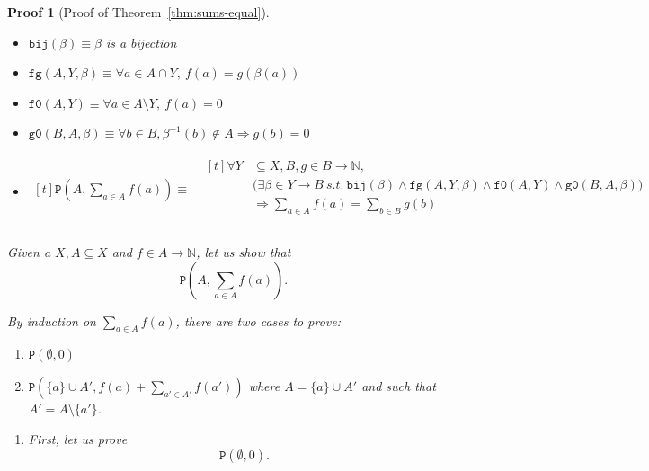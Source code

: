 \documentclass[pdflatex,sn-mathphys]{sn-jnl}%
\theoremstyle{thmstyleone}%
\theoremstyle{thmstyletwo}%
\newtheorem*{pf}{Proof}%
\theoremstyle{thmstylethree}%
\begin{document}
\begin{appendices}
\begin{pf}[Proof of Theorem~\ref{thm:sums-equal}]
  \begin{itemize}
  \item $\mathtt{bij}(\beta)\equiv\beta$ is a bijection
  \item
    $\mathtt{fg}(A,Y,\beta)\equiv\forall{}a\in{}A\cap{}Y,~f(a)=g(\beta(a))$
  \item $\mathtt{f0}(A,Y)\equiv\forall{}a\in{}A\setminus{}Y,~f(a)=0$
  \item
    $\mathtt{g0}(B,A,\beta)\equiv\forall{}b\in{}B,\beta^{-1}(b)\notin{}A\Rightarrow{}g(b)=0$
  \item $\begin{aligned}[t]
           \mathtt{P}(A,\sum\limits_{a\in{}A}f(a))\equiv{}& \begin{aligned}[t]
                                                              \forall{}Y&\subseteq{}X,B,g\in{}B\rightarrow{}\mathbb{N}, \\
                                                                        & \big(\exists{}\beta\in{}Y\rightarrow{}B~s.t.~\mathtt{bij}(\beta)\land\mathtt{fg}(A,Y,\beta)\land\mathtt{f0}(A,Y)\land\mathtt{g0}(B,A,\beta)\big) \\
                                                                        & \Rightarrow{}\sum\limits_{a\in{}A}f(a)=\sum\limits_{b\in{}B}g(b)\\
                                                            \end{aligned} \\
         \end{aligned}$
       \end{itemize}

       Given a $X, A\subseteq{}X$ and $f\in{}A\rightarrow{}\mathbb{N}$,
       let us show that
       \begin{equation*}
         \boxed{\mathtt{P}(A,\sum\limits_{a\in{}A}f(a)).}
       \end{equation*}

       By induction on $\sum\limits_{a\in{}A}f(a)$, there are two cases
       to prove:
       \begin{enumerate}
       \item $\boxed{\mathtt{P}(\emptyset,0)}$
       \item
         $\boxed{\mathtt{P}(\{a\}\cup{}A',f(a)+\sum_{a'\in{}A'}f(a'))}$
         where $A=\{a\}\cup{}A'$ and such that $A'=A\setminus{}\{a'\}$.
       \end{enumerate}

       \begin{enumerate}
       \item First, let us prove
         \begin{equation*}
           \boxed{\mathtt{P}(\emptyset,0).}
         \end{equation*}


\end{enumerate}
\end{pf}
\end{appendices}
\end{document}
